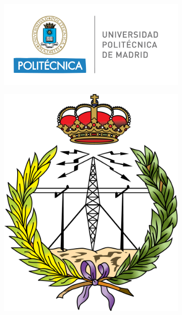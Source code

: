 \documentclass[a4paper,oneside]{book}
\begin{document}
\begin{figure}[t!]
	\centering
	\begin{subfigure}[b]{0.65\linewidth}
		\includegraphics[width=\linewidth]{../../Archivos comunes/upm_logo.png}
	\end{subfigure}
	\begin{subfigure}[b]{0.25\linewidth}
		\includegraphics[width=\linewidth]{../../Archivos comunes/etsist_logo.png}
	\end{subfigure}
\end{figure}
\end{document}
